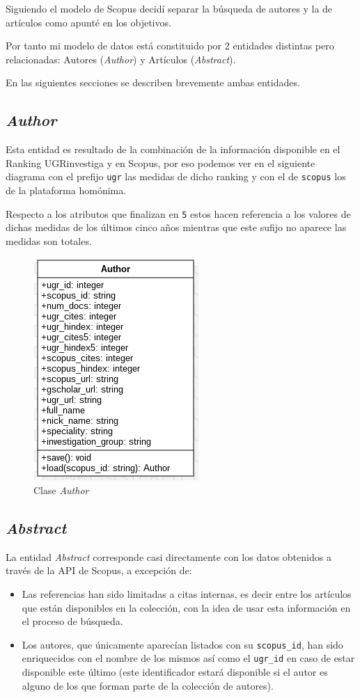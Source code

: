Siguiendo el modelo de Scopus decidí separar la búsqueda de autores y la de artículos como apunté en los objetivos.

Por tanto mi modelo de datos está constituido por 2 entidades distintas pero relacionadas: Autores (\textit{Author}) y Artículos (\textit{Abstract}). 

En las siguientes secciones se describen brevemente ambas entidades.


\subsection{\textit{Author}}
\label{subsc:author}
Esta entidad es resultado de la combinación de la información disponible en el Ranking UGRinvestiga \cite{Ranking_UGRInvestiga} y en Scopus, por eso podemos ver en el siguiente diagrama con el prefijo \texttt{ugr} las medidas de dicho ranking y con el de \texttt{scopus} los de la plataforma homónima. 

Respecto a los atributos que finalizan en \texttt{5} estos hacen referencia a los valores de dichas medidas de los últimos cinco años mientras que este sufijo no aparece las medidas son totales.

\begin{figure}[ht]
	
	\centering
	\includegraphics[width=0.4\linewidth]{imagenes/Author}
	\caption{Clase \textit{Author}}
\end{figure}

\newpage

\subsection{\textit{Abstract}}
\label{subsc:abstract}
La entidad \textit{Abstract} corresponde casi directamente con los datos obtenidos a través de la \acrshort{API} de Scopus, a excepción de:
\begin{itemize}
	\item Las referencias han sido limitadas a citas internas, es decir entre los artículos que están disponibles en la colección, con la idea de usar esta información en el proceso de búsqueda.
	\item Los autores, que únicamente aparecían listados con su \texttt{scopus\_id}, han sido enriquecidos con el nombre de los mismos así como el \texttt{ugr\_id} en caso de estar disponible este último (este identificador estará disponible si el autor es alguno de los que forman parte de la colección de autores).
\end{itemize}

